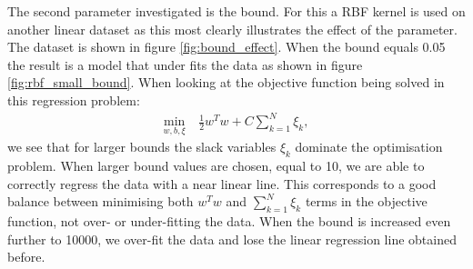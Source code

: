 \documentclass{article}
\begin{document}
    
        The second parameter investigated is the bound. For this a RBF kernel is used on another linear dataset as this most clearly illustrates the effect of the parameter. The dataset is shown in figure \ref{fig:bound_effect}. When the bound equals 0.05 the result is a model that under fits the data as shown in figure \ref{fig:rbf_small_bound}. When looking at the objective function being solved in this regression problem:
        \begin{equation}\label{eq:bound}
        \begin{split}
            \min_{w,b,\xi} & \ \frac{1}{2} w^T w + C \sum^N_{k=1} \xi_k,
        \end{split}
        \end{equation}
        we see that for larger bounds the slack variables $\xi_k$ dominate the optimisation problem. When larger bound values are chosen, equal to 10, we are able to correctly regress the data with a near linear line. This corresponds to a good balance between minimising both $w^T w$ and $\sum^N_{k=1} \xi_k$ terms in the objective function, not over- or under-fitting the data. When the bound is increased even further to 10000, we over-fit the data and lose the linear regression line obtained before. 
\end{document}
